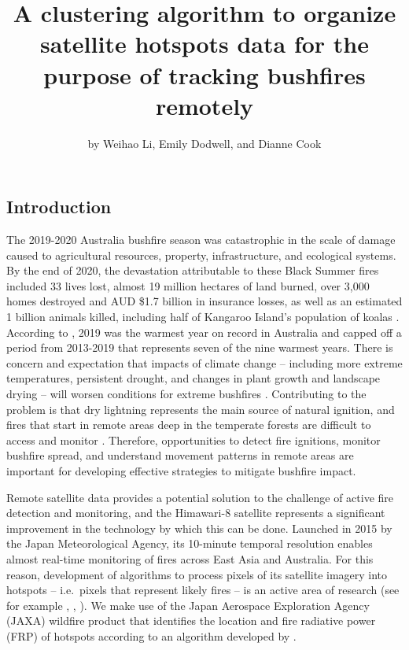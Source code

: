 \title{A clustering algorithm to organize satellite hotspots data for
the purpose of tracking bushfires remotely}
\author{by Weihao Li, Emily Dodwell, and Dianne Cook}

\maketitle


\hypertarget{introduction}{%
\subsection{Introduction}\label{introduction}}

The 2019-2020 Australia bushfire season was catastrophic in the scale of
damage caused to agricultural resources, property, infrastructure, and
ecological systems. By the end of 2020, the devastation attributable to
these Black Summer fires included 33 lives lost, almost 19 million
hectares of land burned, over 3,000 homes destroyed and AUD \$1.7
billion in insurance losses, as well as an estimated 1 billion animals
killed, including half of Kangaroo Island's population of koalas
\citep{Filkov2020}. According to \citet{climate2020}, 2019 was the
warmest year on record in Australia and capped off a period from
2013-2019 that represents seven of the nine warmest years. There is
concern and expectation that impacts of climate change -- including more
extreme temperatures, persistent drought, and changes in plant growth
and landscape drying -- will worsen conditions for extreme bushfires
\citep[\citet{Deb2020}]{climate2020}. Contributing to the problem is
that dry lightning represents the main source of natural ignition, and
fires that start in remote areas deep in the temperate forests are
difficult to access and monitor \citep{Abram2021}. Therefore,
opportunities to detect fire ignitions, monitor bushfire spread, and
understand movement patterns in remote areas are important for
developing effective strategies to mitigate bushfire impact.

Remote satellite data provides a potential solution to the challenge of
active fire detection and monitoring, and the Himawari-8 satellite
represents a significant improvement in the technology by which this can
be done. Launched in 2015 by the Japan Meteorological Agency, its
10-minute temporal resolution enables almost real-time monitoring of
fires across East Asia and Australia. For this reason, development of
algorithms to process pixels of its satellite imagery into hotspots --
i.e.~pixels that represent likely fires -- is an active area of research
(see for example \citet{Xu2017}, \citet{Wickramasinghe2016},
\citet{Jang2019}). We make use of the Japan Aerospace Exploration Agency
(JAXA) wildfire product \citep{jaxa} that identifies the location and
fire radiative power (FRP) of hotspots according to an algorithm
developed by \citet{Kurihara2020}.

